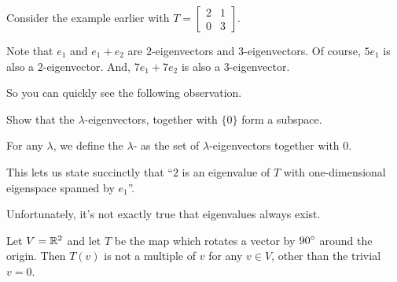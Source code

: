 \begin{example}
	Consider the example earlier with
	$T = \begin{bmatrix} 2 & 1 \\ 0 & 3 \end{bmatrix}$.
	\begin{enumerate}[(a)]
		\ii Note that $e_1$ and $e_1 + e_2$ are
		$2$-eigenvectors and $3$-eigenvectors.
		\ii Of course, $5e_1$ is also a $2$-eigenvector.
		\ii And, $7e_1 + 7e_2$ is also a $3$-eigenvector.
	\end{enumerate}
\end{example}
So you can quickly see the following observation.
\begin{ques}
	Show that the $\lambda$-eigenvectors, together with $\{0\}$
	form a subspace.
\end{ques}
\begin{definition}
	For any $\lambda$, we define the $\lambda$-
	as the set of $\lambda$-eigenvectors together with $0$.
\end{definition}
This lets us state succinctly that
``$2$ is an eigenvalue of $T$
with one-dimensional eigenspace spanned by $e_1$''.

Unfortunately, it's not exactly true that eigenvalues always exist.
\begin{example}
	Let $V = \mathbb R^2$ and let $T$ be the map
	which rotates a vector by $90^\circ$
	around the origin.
	Then $T(v)$ is not a multiple of $v$ for any $v \in V$,
	other than the trivial $v=0$.
\end{example}

